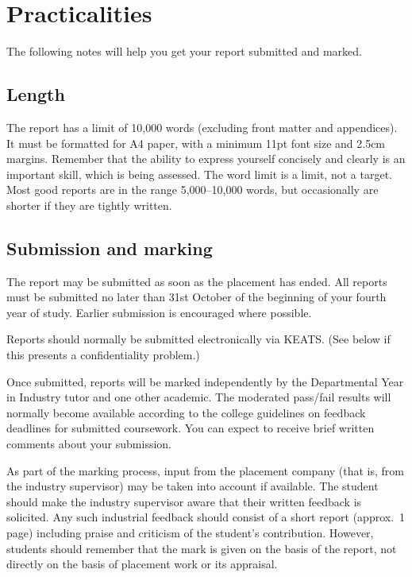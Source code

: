\documentclass[12pt,a4paper,twoside,openright]{report}
\begin{document}
\chapter{Practicalities}

The following notes will help you get your report submitted and marked.

\section{Length}

The report has a limit of 10,000 words (excluding front matter and appendices).
It must be formatted for A4 paper, with a minimum 11pt font size and 2.5cm margins.
Remember that the ability to express yourself concisely and clearly is an important
skill, which is being assessed.
The word limit is a limit, not a target.
Most good reports are in the range 5,000--10,000 words,
but occasionally are shorter if they are tightly written.

\section{Submission and marking}

The report may be submitted as soon as the placement has ended.
All reports must be submitted no later than 31st October of the beginning of your fourth year
of study.
Earlier submission is encouraged where possible.

Reports should normally be submitted electronically via KEATS.
(See below if this presents a confidentiality problem.)

Once submitted, reports will be marked independently by the Departmental Year in Industry
tutor and one other academic.
The moderated pass/fail results will normally become available according to the college guidelines
on feedback deadlines for submitted coursework.
You can expect to receive brief written comments about your submission.

As part of the marking process, input from the placement company
(that is, from the industry supervisor)
may be taken into account if available.
The student should make the industry supervisor aware that their written feedback is solicited.
Any such industrial feedback should consist of a short report (approx.\ 1 page)
including praise and criticism of the student's contribution.
However, students should remember that the mark is given on the basis of the report,
not directly on the basis of placement work or its appraisal.
\end{document}
